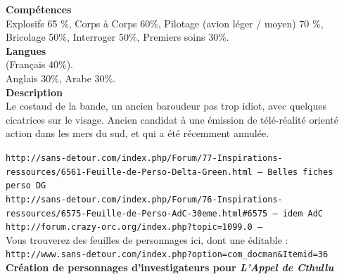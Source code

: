 \documentclass[11pt,twoside,a4paper]{article}
\begin{document}
\begin{multicols}{3}
	\textbf{Comp{\'e}tences}~\\
		Explosifs 65 \%, 
		Corps {\`a} Corps 60\%, 
		Pilotage (avion l{\'e}ger / moyen) 70 \%, 
		Bricolage 50\%, 
		Interroger 50\%, 
		Premiers soins 30\%. ~\\

	\textbf{Langues}~\\
	(Fran\c{c}ais 40\%). ~\\
	Anglais 30\%, Arabe 30\%. ~\\

	\textbf{Description}~\\
	Le costaud de la bande, un ancien baroudeur pas trop idiot, avec quelques cicatrices sur le visage. Ancien candidat {\`a} une {\'e}mission de t{\'e}l{\'e}-r{\'e}alit{\'e} orient{\'e} action dans les mers du sud, et qui a {\'e}t{\'e} r{\'e}cemment annul{\'e}e. ~\\

	

	
\end{multicols}

\clearpage

	\setlength\parindent{20pt}
	
	\normalsize

\texttt{http://sans-detour.com/index.php/Forum/77-Inspirations-ressources/6561-Feuille-de-Perso-Delta-Green.html -- Belles fiches perso DG}~\\
\texttt{http://sans-detour.com/index.php/Forum/76-Inspirations-ressources/6575-Feuille-de-Perso-AdC-30eme.html\#6575 -- idem AdC}~\\

\texttt{http://forum.crazy-orc.org/index.php?topic=1099.0 -- }~\\

Vous trouverez des feuilles de personnages ici, dont une {\'e}ditable : ~\\
\texttt{http://www.sans-detour.com/index.php?option=com\_docman\&Itemid=36}~\\

\textbf{\Large Cr{\'e}ation de personnages d'investigateurs pour \emph{L'Appel de Cthullu}}~\\
\end{document}
